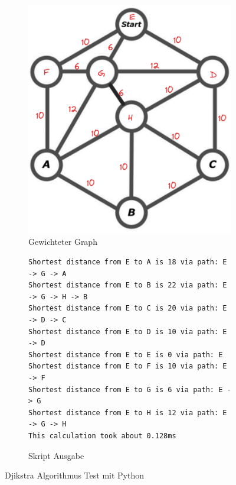 \begin{figure}[H]
\begin{subfigure}{0.275\textwidth}
\includegraphics[width=0.95\linewidth]{img/graph_with_weighted_edges.png} 
\caption{Gewichteter Graph}
\label{fig:weighted-graph}
\end{subfigure}
\begin{subfigure}{0.720\textwidth}
\begin{footnotesize}
\begin{verbatim}
Shortest distance from E to A is 18 via path: E -> G -> A
Shortest distance from E to B is 22 via path: E -> G -> H -> B
Shortest distance from E to C is 20 via path: E -> D -> C
Shortest distance from E to D is 10 via path: E -> D
Shortest distance from E to E is 0 via path: E
Shortest distance from E to F is 10 via path: E -> F
Shortest distance from E to G is 6 via path: E -> G
Shortest distance from E to H is 12 via path: E -> G -> H
This calculation took about 0.128ms
\end{verbatim}
\end{footnotesize}
\caption{Skript Ausgabe}
\label{fig:djikstra-test-skript-output}
\end{subfigure}

\caption{Djikstra Algorithmus Test mit Python}
\label{fig:djikstra-test-output}
\end{figure}

